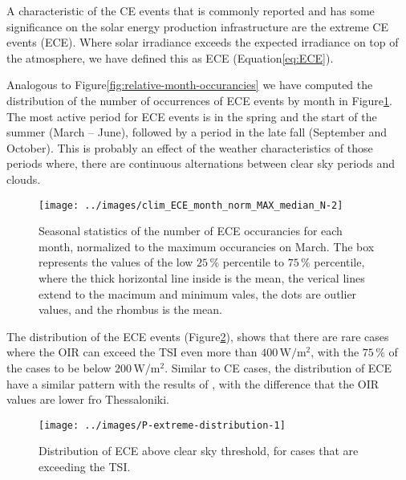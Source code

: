 \documentclass[preprint, 3p,
authoryear]{elsarticle} %
\begin{document}
A characteristic of the CE events that is commonly reported and has some
significance on the solar energy production infrastructure are the
extreme CE events (ECE). Where solar irradiance exceeds the expected
irradiance on top of the atmosphere, we have defined this as ECE
(Equation\nobreakspace{}\ref{eq:ECE}).

Analogous to Figure\nobreakspace{}\ref{fig:relative-month-occurancies}
we have computed the distribution of the number of occurrences of ECE
events by month in
Figure\nobreakspace{}\ref{fig:relative-month-occurancies-ECE}. The most
active period for ECE events is in the spring and the start of the
summer (March -- June), followed by a period in the late fall (September
and October). This is probably an effect of the weather characteristics
of those periods where, there are continuous alternations between clear
sky periods and clouds.

\begin{figure}

{\centering \texttt{[image: ../images/clim\_ECE\_month\_norm\_MAX\_median\_N-2]} 

}

\caption{Seasonal statistics of the number of ECE occurancies for each month, normalized to the maximum occurancies on March. The box represents the values of the low $25\,\%$ percentile to $75\,\%$ percentile, where the thick horizontal line inside is the mean, the verical lines extend to the macimum and minimum vales, the dots are outlier values, and the rhombus is the mean.}\label{fig:relative-month-occurancies-ECE}
\end{figure}

The distribution of the ECE events
(Figure\nobreakspace{}\ref{fig:P-extreme-distribution}), shows that
there are rare cases where the OIR can exceed the TSI even more than
\(400\,\text{W}/\text{m}^2\), with the \(75\,\%\) of the cases to be
below \(200\,\text{W}/\text{m}^2\). Similar to CE cases, the
distribution of ECE have a similar pattern with the results of
\citet{Vamvakas2020}, with the difference that the OIR values are lower
fro Thessaloniki.

\begin{figure}

{\centering \texttt{[image: ../images/P-extreme-distribution-1]} 

}

\caption{Distribution of ECE above clear sky threshold, for cases that are exceeding the TSI.}\label{fig:P-extreme-distribution}
\end{figure}
\end{document}
